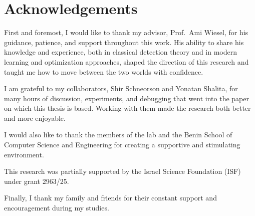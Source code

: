 \chapter*{Acknowledgements}

First and foremost, I would like to thank my advisor, Prof.~Ami Wiesel, for his guidance, patience, and support throughout this work. His ability to share his knowledge and experience, both in classical detection theory and in modern learning and optimization approaches, shaped the direction of this research and taught me how to move between the two worlds with confidence.

I am grateful to my collaborators, Shir Schneorson and Yonatan Shalita, for many hours of discussion, experiments, and debugging that went into the paper on which this thesis is based. Working with them made the research both better and more enjoyable.

I would also like to thank the members of the lab and the Benin School of Computer Science and Engineering for creating a supportive and stimulating environment.

This research was partially supported by the Israel Science Foundation (ISF) under grant 2963/25.

Finally, I thank my family and friends for their constant support and encouragement during my studies.